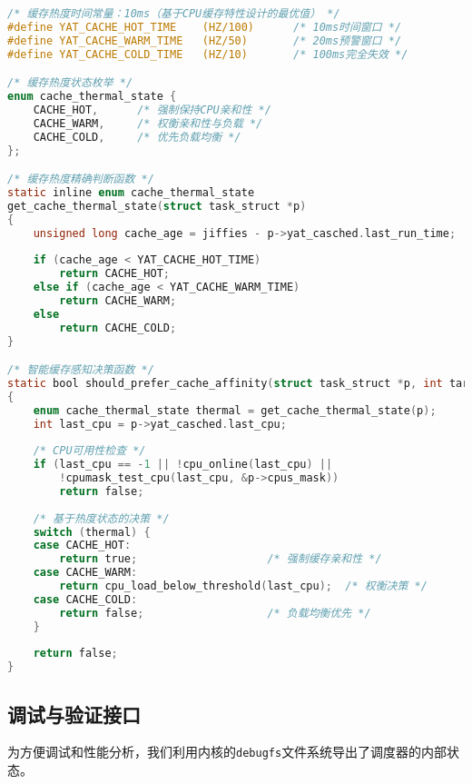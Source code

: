 \begin{tcolorbox} [
    enhanced, colback=red!5, colframe=red!40!black, leftrule=3mm, rightrule=0mm, toprule=0mm, bottomrule=0mm, arc=2mm, left=5mm, right=5mm, top=3mm, bottom=3mm, fonttitle=\bfseries, title=\textbf{缓存热度时间窗口核心实现}
]
\begin{lstlisting}[language=C, basicstyle=\footnotesize\ttfamily, showstringspaces=false]
/* 缓存热度时间常量：10ms（基于CPU缓存特性设计的最优值） */
#define YAT_CACHE_HOT_TIME    (HZ/100)      /* 10ms时间窗口 */
#define YAT_CACHE_WARM_TIME   (HZ/50)       /* 20ms预警窗口 */
#define YAT_CACHE_COLD_TIME   (HZ/10)       /* 100ms完全失效 */

/* 缓存热度状态枚举 */
enum cache_thermal_state {
    CACHE_HOT,      /* 强制保持CPU亲和性 */
    CACHE_WARM,     /* 权衡亲和性与负载 */
    CACHE_COLD,     /* 优先负载均衡 */
};

/* 缓存热度精确判断函数 */
static inline enum cache_thermal_state 
get_cache_thermal_state(struct task_struct *p)
{
    unsigned long cache_age = jiffies - p->yat_casched.last_run_time;
    
    if (cache_age < YAT_CACHE_HOT_TIME)
        return CACHE_HOT;
    else if (cache_age < YAT_CACHE_WARM_TIME)
        return CACHE_WARM;
    else
        return CACHE_COLD;
}

/* 智能缓存感知决策函数 */
static bool should_prefer_cache_affinity(struct task_struct *p, int target_cpu)
{
    enum cache_thermal_state thermal = get_cache_thermal_state(p);
    int last_cpu = p->yat_casched.last_cpu;
    
    /* CPU可用性检查 */
    if (last_cpu == -1 || !cpu_online(last_cpu) || 
        !cpumask_test_cpu(last_cpu, &p->cpus_mask))
        return false;
    
    /* 基于热度状态的决策 */
    switch (thermal) {
    case CACHE_HOT:
        return true;                    /* 强制缓存亲和性 */
    case CACHE_WARM:
        return cpu_load_below_threshold(last_cpu);  /* 权衡决策 */
    case CACHE_COLD:
        return false;                   /* 负载均衡优先 */
    }
    
    return false;
}
\end{lstlisting}
\end{tcolorbox}

\subsection{调试与验证接口}
为方便调试和性能分析，我们利用内核的\texttt{debugfs}文件系统导出了调度器的内部状态。

